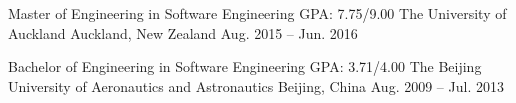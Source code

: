 


\begin{education}


\cvedu
{Master of Engineering in Software Engineering} %
{GPA: 7.75/9.00} %
{The University of Auckland} %
{Auckland, New Zealand} %
{Aug. 2015 – Jun. 2016} %


\cvedu
{Bachelor of Engineering in Software Engineering} %
{GPA: 3.71/4.00} %
{The Beijing University of Aeronautics and Astronautics} %
{Beijing, China} %
{Aug. 2009 – Jul. 2013} %


\end{education}
